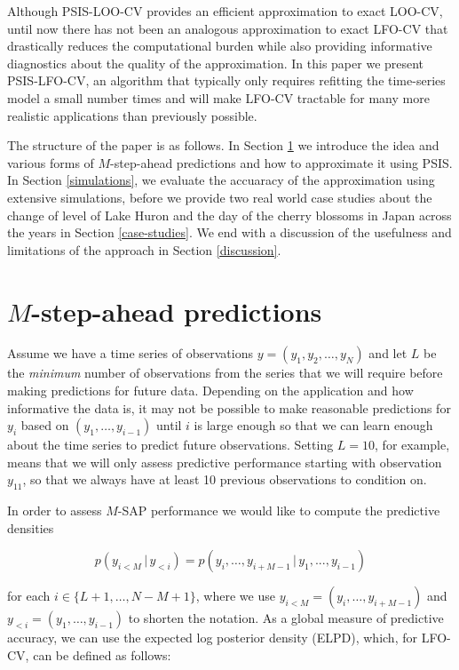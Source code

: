 \documentclass[american,]{article}
\begin{document}
Although PSIS-LOO-CV provides an efficient approximation to exact LOO-CV, until
now there has not been an analogous approximation to exact LFO-CV that
drastically reduces the computational burden while also providing informative
diagnostics about the quality of the approximation. In this paper we
present PSIS-LFO-CV, an algorithm that typically only requires refitting the
time-series model a small number times and will make LFO-CV tractable for many
more realistic applications than previously possible.

The structure of the paper is as follows. In Section \ref{m-sap} we introduce
the idea and various forms of \(M\)-step-ahead predictions and how to approximate
it using PSIS. In Section \ref{simulations}, we evaluate the accuaracy of the
approximation using extensive simulations, before we provide two real world case
studies about the change of level of Lake Huron and the day of the cherry
blossoms in Japan across the years in Section \ref{case-studies}. We end with a
discussion of the usefulness and limitations of the approach in Section
\ref{discussion}.

\hypertarget{m-sap}{%
\section{\texorpdfstring{\(M\)-step-ahead predictions}{M-step-ahead predictions}}\label{m-sap}}

Assume we have a time series of observations \(y = (y_1, y_2, \ldots, y_N)\)
and let \(L\) be the \emph{minimum} number of observations from the series that
we will require before making predictions for future data. Depending on the
application and how informative the data is, it may not be possible to make
reasonable predictions for \(y_{i}\) based on \((y_1, \dots, y_{i-1})\) until \(i\) is
large enough so that we can learn enough about the time series to predict future
observations. Setting \(L=10\), for example, means that we will only assess
predictive performance starting with observation \(y_{11}\), so that we
always have at least 10 previous observations to condition on.

In order to assess \(M\)-SAP performance we would like to compute the
predictive densities

\begin{equation}
p(y_{i<M} \,|\, y_{<i}) = p(y_i, \ldots, y_{i + M - 1} \,|\, y_{1},...,y_{i-1}) 
\end{equation}

for each \(i \in \{L + 1, \ldots, N - M + 1\}\), where we use
\(y_{i<M} = (y_i, \ldots, y_{i + M - 1})\) and \(y_{<i} = (y_{1}, \ldots, y_{i-1})\)
to shorten the notation. As a global measure of predictive accuracy, we
can use the expected log posterior density (ELPD), which, for LFO-CV, can
be defined as follows:
\end{document}
